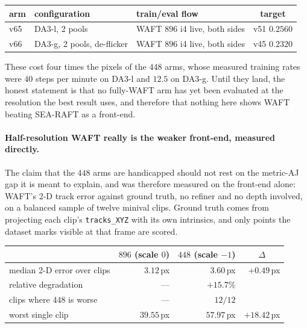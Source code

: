 \documentclass[11pt,a4paper]{article}
\begin{document}
\begin{center}\small
\begin{tabular}{lllc}
\toprule
arm & configuration & train/eval flow & target \\
\midrule
v65 & DA3-l, 2 pools               & WAFT $896$ i4 live, both sides & v51 $0.2560$ \\
v66 & DA3-g, 2 pools, de-flicker   & WAFT $896$ i4 live, both sides & v45 $0.2320$ \\
\bottomrule
\end{tabular}
\end{center}

\noindent These cost four times the pixels of the $448$ arms, whose measured training rates were
$40$ steps per minute on DA3-l and $12.5$ on DA3-g. Until they land, the honest statement is that no
fully-WAFT arm has yet been evaluated at the resolution the best result uses, and therefore that
nothing here shows WAFT beating SEA-RAFT as a front-end.

\paragraph{Half-resolution WAFT really is the weaker front-end, measured directly.} The claim that
the $448$ arms are handicapped should not rest on the metric-AJ gap it is meant to explain, and was
therefore measured on the front-end alone: WAFT's 2-D track error against ground truth, no refiner and no
depth involved, on a balanced sample of twelve minival clips. Ground truth comes from projecting
each clip's \texttt{tracks\_XYZ} with its own intrinsics, and only points the dataset marks visible
at that frame are scored.

\begin{center}\small
\begin{tabular}{lrrr}
\toprule
& \multicolumn{1}{c}{$896$ (scale $0$)} & \multicolumn{1}{c}{$448$ (scale $-1$)} & \multicolumn{1}{c}{$\Delta$} \\
\midrule
median 2-D error over clips & $3.12$\,px & $3.60$\,px & $+0.49$\,px \\
relative degradation        & ---        & $+15.7\%$  & \\
clips where $448$ is worse  & ---        & $12/12$    & \\
worst single clip           & $39.55$\,px & $57.97$\,px & $+18.42$\,px \\
\bottomrule
\end{tabular}
\end{center}
\end{document}
